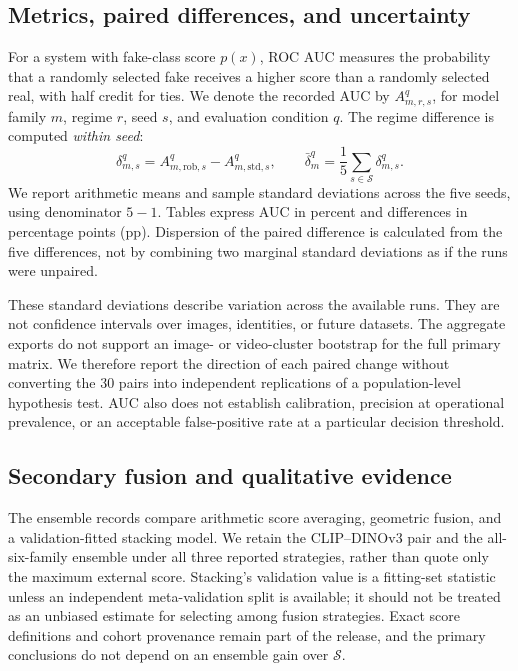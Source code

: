 \documentclass[conference,10pt,letterpaper]{IEEEtran}
\newcommand{\std}{\mathrm{std}}
\newcommand{\rob}{\mathrm{rob}}
\begin{document}
\subsection{Metrics, paired differences, and uncertainty}
For a system with fake-class score $p(x)$, ROC AUC measures the probability that a randomly selected fake receives a higher score than a randomly selected real, with half credit for ties. We denote the recorded AUC by $A_{m,r,s}^{q}$, for model family $m$, regime $r$, seed $s$, and evaluation condition $q$. The regime difference is computed \emph{within seed}:
\begin{equation}
\delta_{m,s}^{q}=A_{m,\rob,s}^{q}-A_{m,\std,s}^{q},\qquad
\bar\delta_m^{q}=\frac{1}{5}\sum_{s\in\mathcal S}\delta_{m,s}^{q}.
\label{eq:paired}
\end{equation}
We report arithmetic means and sample standard deviations across the five seeds, using denominator $5-1$. Tables express AUC in percent and differences in percentage points (pp). Dispersion of the paired difference is calculated from the five differences, not by combining two marginal standard deviations as if the runs were unpaired.

These standard deviations describe variation across the available runs. They are not confidence intervals over images, identities, or future datasets. The aggregate exports do not support an image- or video-cluster bootstrap for the full primary matrix. We therefore report the direction of each paired change without converting the 30 pairs into independent replications of a population-level hypothesis test. AUC also does not establish calibration, precision at operational prevalence, or an acceptable false-positive rate at a particular decision threshold.

\subsection{Secondary fusion and qualitative evidence}
The ensemble records compare arithmetic score averaging, geometric fusion, and a validation-fitted stacking model. We retain the CLIP--DINOv3 pair and the all-six-family ensemble under all three reported strategies, rather than quote only the maximum external score. Stacking's validation value is a fitting-set statistic unless an independent meta-validation split is available; it should not be treated as an unbiased estimate for selecting among fusion strategies. Exact score definitions and cohort provenance remain part of the release, and the primary conclusions do not depend on an ensemble gain over $\mathcal S$.
\end{document}
